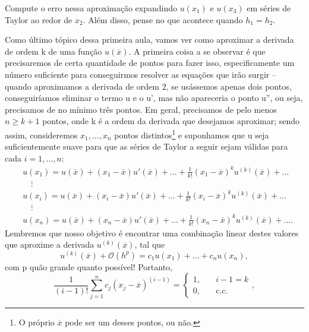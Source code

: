 \documentclass[../differential_methods.tex]{subfiles}
\begin{document}
\begin{exr}
	Compute o erro nessa aproximação expandindo \(u(x_1)\) e \(u(x_3)\) em séries de Taylor ao redor de \(x_2\). Além disso, pense no que acontece quando \(h_1=h_2\).
\end{exr}

Como último tópico dessa primeira aula, vamos ver como aproximar a derivada de ordem k de uma função \(u(\overline{x})\). A primeira coisa a se observar é que precisaremos de certa quantidade de pontos para fazer isso, especificamente um número suficiente para conseguirmos resolver as equações que irão surgir -- quando aproximamos a derivada de ordem 2, se usássemos apenas dois pontos, conseguiríamos eliminar o termo u e o u', mas não apareceria o ponto u'', ou seja, precisamos de no mínimo três pontos.
Em geral, precisamos de pelo menos \(n\geq k+1\) pontos, onde k é a ordem da derivada que desejamos aproximar; sendo assim, consideremos \(x_1,\dotsc ,x_{n}\) pontos distintos\footnote{O próprio \(\overline{x}\) pode ser um desses pontos, ou não.} e suponhamos que u seja suficientemente suave para que as séries de Taylor a seguir sejam válidas para cada \(i=1,\dotsc ,n:\)
\begin{align*}
	 & u(x_{1})=u(\overline{x})+(x_1-\overline{x})u'(\overline{x})+\dotsc + \frac{1}{k!}(x_1-\overline{x})^{k}u^{(k)}(\overline{x})+\dotsc  \\
	 & \quad \vdots                                                                                                                         \\
	 & u(x_{i})=u(\overline{x})+(x_i-\overline{x})u'(\overline{x})+\dotsc + \frac{1}{k!}(x_i-\overline{x})^{k}u^{(k)}(\overline{x})+\dotsc  \\
	 & \quad \vdots                                                                                                                         \\
	 & u(x_{n})=u(\overline{x})+(x_n-\overline{x})u'(\overline{x})+\dotsc + \frac{1}{k!}(x_n-\overline{x})^{k}u^{(k)}(\overline{x})+\dotsc.
\end{align*}
Lembremos que nosso objetivo é encontrar uma combinação linear destes valores que aproxime a derivada \(u^{(k)}(\overline{x})\), tal que
\[
	u^{(k)}(\overline{x})+\mathcal{O}(h^{p})=c_1u(x_1)+\dotsc +c_{n}u(x_{n}),
\]
com p quão grande quanto possível! Portanto,
\[
	\frac{1}{(i-1)!} \sum\limits_{j=1}^{n}c_{j}(x_{j}-\overline{x})^{(i-1)} = \left\{\begin{array}{ll}
		1, & \quad i-1=k       \\
		0, & \quad \text{c.c.}
	\end{array}\right.,
\]
\end{document}
